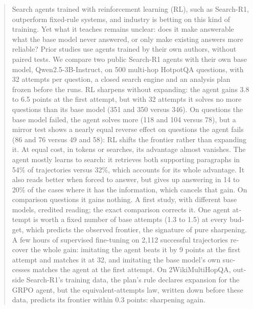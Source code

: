 \begin{otherlanguage}{english}
\begin{abstract}
\noindent Search agents trained with reinforcement learning (RL), such as Search-R1, outperform fixed-rule systems, and industry is betting on this kind of training. Yet what it teaches remains unclear: does it make answerable what the base model never answered, or only make existing answers more reliable? Prior studies use agents trained by their own authors, without paired tests. We compare two public Search-R1 agents with their own base model, Qwen2.5-3B-Instruct, on 500 multi-hop HotpotQA questions, with 32 attempts per question, a closed search engine and an analysis plan frozen before the runs. RL sharpens without expanding: the agent gains 3.8 to 6.5 points at the first attempt, but with 32 attempts it solves no more questions than its base model (351 and 350 versus 346). On questions the base model failed, the agent solves more (118 and 104 versus 78), but a mirror test shows a nearly equal reverse effect on questions the agent fails (86 and 76 versus 49 and 58): RL shifts the frontier rather than expanding it. At equal cost, in tokens or searches, its advantage almost vanishes. The agent mostly learns to search: it retrieves both supporting paragraphs in 54\% of trajectories versus 32\%, which accounts for its whole advantage. It also reads better when forced to answer, but gives up answering in 14 to 20\% of the cases where it has the information, which cancels that gain. On comparison questions it gains nothing. A first study, with different base models, credited reading; the exact comparison corrects it. One agent attempt is worth a fixed number of base attempts (1.3 to 1.5) at every budget, which predicts the observed frontier, the signature of pure sharpening. A few hours of supervised fine-tuning on 2,112 successful trajectories recover the whole gain: imitating the agent beats it by 9 points at the first attempt and matches it at 32, and imitating the base model's own successes matches the agent at the first attempt. On 2WikiMultiHopQA, outside Search-R1's training data, the plan's rule declares expansion for the GRPO agent, but the equivalent-attempts law, written down before these data, predicts its frontier within 0.3 points: sharpening again.
\end{abstract}
\end{otherlanguage}
